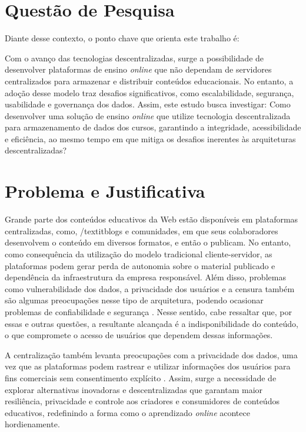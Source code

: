 \section{Questão de Pesquisa}
Diante desse contexto, o ponto chave que orienta este trabalho é:

Com o avanço das tecnologias descentralizadas, surge a possibilidade de desenvolver plataformas de ensino \textit{online} que não dependam de servidores centralizados para armazenar e distribuir conteúdos educacionais. No entanto, a adoção desse modelo traz desafios significativos, como escalabilidade, segurança, usabilidade e governança dos dados. Assim, este estudo busca investigar: Como desenvolver uma solução de ensino \textit{online} que utilize tecnologia descentralizada para armazenamento de dados dos cursos, garantindo a integridade, acessibilidade e eficiência, ao mesmo tempo em que mitiga os desafios inerentes às arquiteturas descentralizadas?

\section{Problema e Justificativa}

Grande parte dos conteúdos educativos da Web estão disponíveis em plataformas centralizadas, como, /textit{blogs} e comunidades, em que seus colaboradores desenvolvem o conteúdo em diversos formatos, e então o publicam. No entanto, como consequência da utilização do modelo tradicional cliente-servidor, as plataformas podem gerar perda de autonomia sobre o material publicado e dependência da infraestrutura da empresa responsável. Além disso, problemas como vulnerabilidade dos dados, a privacidade dos usuários e a censura também são algumas preocupações nesse tipo de arquitetura, podendo ocasionar problemas de confiabilidade e segurança \cite{wanner2024}. Nesse sentido, cabe ressaltar que, por essas e outras questões, a resultante alcançada é a indisponibilidade do conteúdo, o que compromete o acesso de usuários que dependem dessas informações. 

A centralização também levanta preocupações com a privacidade dos dados, uma vez que as plataformas podem rastrear e utilizar informações dos usuários para fins comerciais sem consentimento explícito \cite{beiro2020}. Assim, surge a necessidade de explorar alternativas inovadoras e descentralizadas que garantam maior resiliência, privacidade e controle aos criadores e consumidores de conteúdos educativos, redefinindo a forma como o aprendizado \textit{online} acontece hordienamente.

